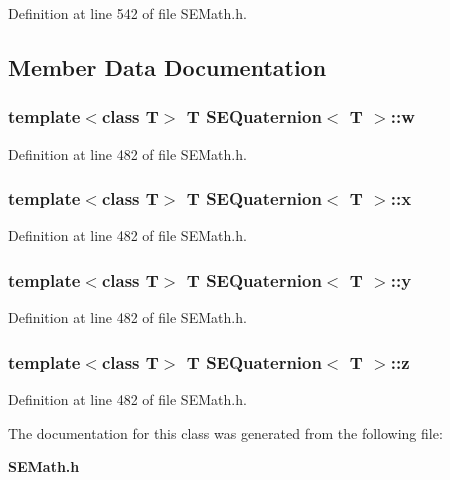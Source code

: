 Definition at line 542 of file S\+E\+Math.\+h.



\subsection{Member Data Documentation}
\subsubsection[{w}]{\setlength{\rightskip}{0pt plus 5cm}template$<$class T$>$ T {\bf S\+E\+Quaternion}$<$ T $>$\+::w}\label{class_s_e_quaternion_aee64949d631db8b98e125fa98700cfe0}


Definition at line 482 of file S\+E\+Math.\+h.

\subsubsection[{x}]{\setlength{\rightskip}{0pt plus 5cm}template$<$class T$>$ T {\bf S\+E\+Quaternion}$<$ T $>$\+::x}\label{class_s_e_quaternion_a967d7d215860f5c7d231f908b93d8fe0}


Definition at line 482 of file S\+E\+Math.\+h.

\subsubsection[{y}]{\setlength{\rightskip}{0pt plus 5cm}template$<$class T$>$ T {\bf S\+E\+Quaternion}$<$ T $>$\+::y}\label{class_s_e_quaternion_af4bc0861bf1711b30eaa6eedf041400d}


Definition at line 482 of file S\+E\+Math.\+h.

\subsubsection[{z}]{\setlength{\rightskip}{0pt plus 5cm}template$<$class T$>$ T {\bf S\+E\+Quaternion}$<$ T $>$\+::z}\label{class_s_e_quaternion_acb8d90e4cbe708d9c0b2eabacc602470}


Definition at line 482 of file S\+E\+Math.\+h.



The documentation for this class was generated from the following file\+:\begin{DoxyCompactItemize}
\item 
{\bf S\+E\+Math.\+h}\end{DoxyCompactItemize}
